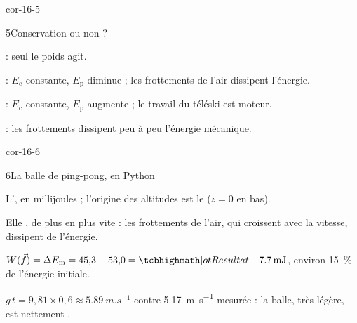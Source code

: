 \begin{blocLivre}{cor-16-5}
\begin{corrige}{5}{Conservation ou non ?}
\begin{questions}
\item {} : seul le poids agit.
\item {} : $E_\mathrm{c}$ constante, $E_\mathrm{p}$ diminue ; les frottements de l'air dissipent l'énergie.
\item {} : $E_\mathrm{c}$ constante, $E_\mathrm{p}$ augmente ; le travail du téléski est moteur.
\item {} : les frottements dissipent peu à peu l'énergie mécanique.
\end{questions}
\end{corrige}
\end{blocLivre}
\begin{blocLivre}{cor-16-6}
\begin{corrige}{6}{La balle de ping-pong, en Python}
\begin{questions}
\item L', en millijoules ; l'origine des altitudes est le  ($z=0$ en bas).
\item Elle , de plus en plus vite : les frottements de l'air, qui croissent avec la vitesse, dissipent de l'énergie.
\item $W(\vec{f})=\Delta E_\mathrm{m}=45{,}3-53{,}0=\res{\qty{-7,7}{mJ}}$, environ \qty{15}{\percent} de l'énergie initiale.
\item $g\,t=9{,}81\times0{,}6\approx\qty{5,89}{m.s^{-1}}$ contre \qty{5,17}{m.s^{-1}} mesurée : la balle, très légère, est nettement .
\end{questions}
\end{corrige}
\end{blocLivre}

